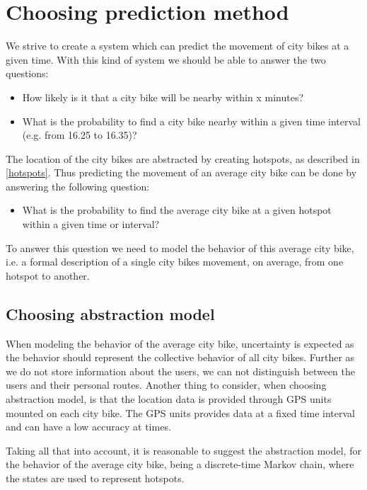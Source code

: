 \section{Choosing prediction method}\label{markov}
We strive to create a system which can predict the movement of city bikes at a given time. With this kind of system we should be able to answer the two questions:
\begin{itemize}
\item How likely is it that a city bike will be nearby within x minutes?
\item What is the probability to find a city bike nearby within a given time interval (e.g. from 16.25 to 16.35)?
\end{itemize}

The location of the city bikes are abstracted by creating hotspots, as described in \cref{hotspots}. Thus predicting the movement of an average city bike can be done by answering the following question:

\begin{itemize}
\item What is the probability to find the average city bike at a given hotspot within a given time or interval?
\end{itemize}

To answer this question we need to model the behavior of this average city bike, i.e. a formal description of a single city bikes movement, on average, from one hotspot to another.

\subsection{Choosing abstraction model}
When modeling the behavior of the average city bike, uncertainty is expected as the behavior should represent the collective behavior of all city bikes.
Further as we do not store information about the users, we can not distinguish between the users and their personal routes.
Another thing to consider, when choosing abstraction model, is that the location data is provided through GPS units mounted on each city bike. The GPS units provides data at a fixed time interval and can have a low accuracy at times.

Taking all that into account, it is reasonable to suggest the abstraction model, for the behavior of the average city bike, being a discrete-time Markov chain, where the states are used to represent hotspots. 




